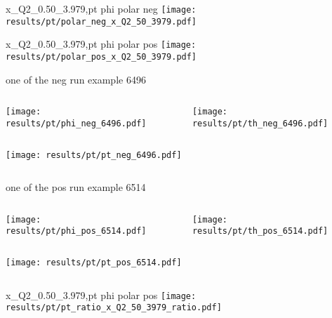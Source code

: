 \begin{frame}{x\_Q2\_0.50\_3.979,pt phi polar neg}
\texttt{[image: results/pt/polar\_neg\_x\_Q2\_50\_3979.pdf]}
\end{frame}
\begin{frame}{x\_Q2\_0.50\_3.979,pt phi polar pos}
\texttt{[image: results/pt/polar\_pos\_x\_Q2\_50\_3979.pdf]}
\end{frame}
\begin{frame}{one of the neg run example 6496}
\begin{columns}
\begin{column}[T]{0.5\textwidth}
\texttt{[image: results/pt/phi\_neg\_6496.pdf]}
\end{column}
\begin{column}[T]{0.5\textwidth}
\texttt{[image: results/pt/th\_neg\_6496.pdf]}
\end{column}
\end{columns}
\begin{columns}
\begin{column}[T]{0.5\textwidth}
\texttt{[image: results/pt/pt\_neg\_6496.pdf]}
\end{column}
\begin{column}[T]{0.5\textwidth}
\end{column}
\end{columns}
\end{frame}
\begin{frame}{one of the pos run example 6514}
\begin{columns}
\begin{column}[T]{0.5\textwidth}
\texttt{[image: results/pt/phi\_pos\_6514.pdf]}
\end{column}
\begin{column}[T]{0.5\textwidth}
\texttt{[image: results/pt/th\_pos\_6514.pdf]}
\end{column}
\end{columns}
\begin{columns}
\begin{column}[T]{0.5\textwidth}
\texttt{[image: results/pt/pt\_pos\_6514.pdf]}
\end{column}
\begin{column}[T]{0.5\textwidth}
\end{column}
\end{columns}
\end{frame}
\begin{frame}{x\_Q2\_0.50\_3.979,pt phi polar pos}
\texttt{[image: results/pt/pt\_ratio\_x\_Q2\_50\_3979\_ratio.pdf]}
\end{frame}
